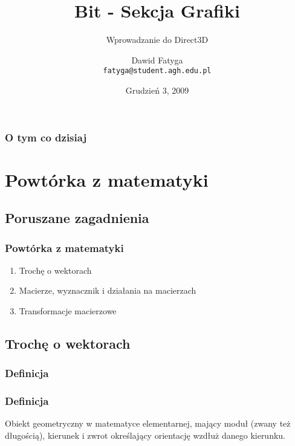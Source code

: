 \documentclass{beamer}
\title[Bit - Sekcja Grafiki]{Bit - Sekcja Grafiki}
\subtitle[Wprowadzanie do Direct3D]{Wprowadzanie do Direct3D}
\author[Dawid Fatyga]{Dawid Fatyga\\ \texttt{fatyga@student.agh.edu.pl}}
\institute[AGH]{Akademia Górniczo Hutnicza}
\date[Grudzień 2009]{Grudzień 3, 2009}
\begin{document}
\begin{frame}
  \titlepage
\end{frame}

\begin{frame}
  \frametitle{O tym co dzisiaj}
  \tableofcontents[pausesections]
\end{frame}

\section{Powtórka z matematyki}
\subsection{Poruszane zagadnienia}
\begin{frame}
  \frametitle{Powtórka z matematyki}

  \begin{enumerate}
    \item Trochę o wektorach
    \item Macierze, wyznacznik i działania na macierzach
    \item Transformacje macierzowe
  \end{enumerate}

\end{frame}

\subsection{Trochę o wektorach}
\subsubsection{Definicja}

\begin{frame}
  \frametitle{Definicja}

  \begin{definition}[Wektor]
    Obiekt geometryczny w matematyce elementarnej, mający moduł (zwany też długością), kierunek i zwrot określający orientację wzdłuż danego kierunku.
  \end{definition}

\end{frame}
\end{document}
